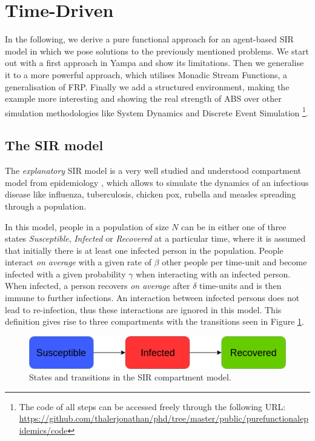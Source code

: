 \section{Time-Driven}
In the following, we derive a pure functional approach for an agent-based SIR model in which we pose solutions to the previously mentioned problems. We start out with a first approach in Yampa and show its limitations. Then we generalise it to a more powerful approach, which utilises Monadic Stream Functions, a generalisation of FRP. Finally we add a structured environment, making the example more interesting and showing the real strength of ABS over other simulation methodologies like System Dynamics and Discrete Event Simulation \footnote{The code of all steps can be accessed freely through the following URL: \url{https://github.com/thalerjonathan/phd/tree/master/public/purefunctionalepidemics/code}}.

\subsection{The SIR model}
The \textit{explanatory} SIR model is a very well studied and understood compartment model from epidemiology \cite{kermack_contribution_1927}, which allows to simulate the dynamics of an infectious disease like influenza, tuberculosis, chicken pox, rubella and measles spreading through a population.

In this model, people in a population of size $N$ can be in either one of three states \textit{Susceptible}, \textit{Infected} or \textit{Recovered} at a particular time, where it is assumed that initially there is at least one infected person in the population. People interact \textit{on average} with a given rate of $\beta$ other people per time-unit and become infected with a given probability $\gamma$ when interacting with an infected person. When infected, a person recovers \textit{on average} after $\delta$ time-units and is then immune to further infections. An interaction between infected persons does not lead to re-infection, thus these interactions are ignored in this model. This definition gives rise to three compartments with the transitions seen in Figure \ref{fig:sir_transitions}.

\begin{figure}
	\centering
	\includegraphics[width=.4\textwidth, angle=0]{./fig/fpabs/timedriven/SIR_transitions.png}
	\caption{States and transitions in the SIR compartment model.}
	\label{fig:sir_transitions}
\end{figure}

